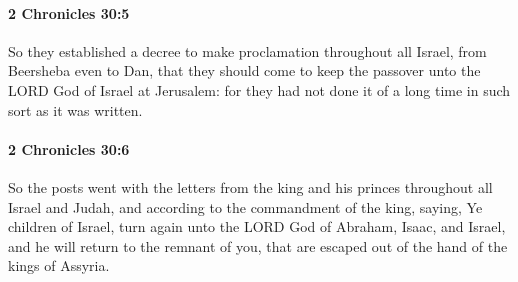 		\paragraph{2 Chronicles 30:5} %
			\label{2CHRONICLES-30-5}

			So they established a decree to make proclamation throughout all Israel, from Beersheba even to Dan, that they should come to keep the passover unto the LORD God of Israel at Jerusalem: for they had not done it of a long time in such sort as it was written.


		\paragraph{2 Chronicles 30:6} %
			\label{2CHRONICLES-30-6}

			So the posts went with the letters from the king and his princes throughout all Israel and Judah, and according to the commandment of the king, saying, Ye children of Israel, turn again unto the LORD God of Abraham, Isaac, and Israel, and he will return to the remnant of you, that are escaped out of the hand of the kings of Assyria.

